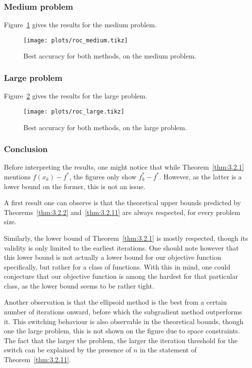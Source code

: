 \documentclass[final]{aomart}
\newcommand{\xk}{x_k}
\newcommand{\fopt}{f^*}
\newcommand{\foptk}{f^*_k}
\newtheorem[{}\it]{thm}{Theorem}[section]
\theoremstyle{definition}
\newtheorem*[{}\it]{notation}{Notation}
\numberwithin{equation}{section}
\newcommand{\thmref}[1]{Theorem~\ref{#1}}
\begin{document}
\subsubsection{Medium problem}
Figure~\ref{fig:roc_medium} gives the results for the medium problem.
\begin{figure}[H]
	\centering
	\texttt{[image: plots/roc\_medium.tikz]}
	\caption{Best accuracy for both methods, on the medium problem.}
	\label{fig:roc_medium}
\end{figure}

\subsubsection{Large problem}
Figure~\ref{fig:roc_large} gives the results for the large problem.
\begin{figure}[H]
	\centering
	\texttt{[image: plots/roc\_large.tikz]}
	\caption{Best accuracy for both methods, on the large problem.}
	\label{fig:roc_large}
\end{figure}

\subsubsection{Conclusion}
\label{sec:expl_roc}

Before interpreting the results, one might notice that while \thmref{thm:3.2.1} mentions \(f(\xk) - \fopt\), the figures only show \(\foptk - \fopt\).
However, as the latter is a lower bound on the former, this is not an issue.

A first result one can observe is that the theoretical upper bounds predicted by Theorems~\ref{thm:3.2.2} and~\ref{thm:3.2.11} are always respected, for every problem size.

Similarly, the lower bound of \thmref{thm:3.2.1} is mostly respected, though its validity is only limited to the earliest iterations.
One should note however that this lower bound is not actually a lower bound for our objective function specifically, but rather for a class of functions.
With this in mind, one could conjecture that our objective function is among the hardest for that particular class, as the lower bound seems to be rather tight.

Another observation is that the ellipsoid method is the best from a certain number of iterations onward, before which the subgradient method outperforms it.
This switching behaviour is also observable in the theoretical bounds, though one the large problem, this is not shown on the figure due to space constraints.
The fact that the larger the problem, the larger the iteration threshold for the switch can be explained by the presence of \(n\) in the statement of \thmref{thm:3.2.11}.
\end{document}
